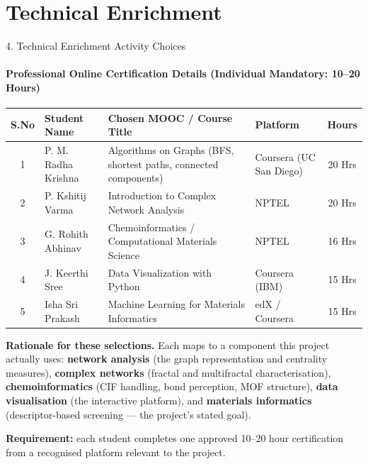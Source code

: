 \documentclass[aspectratio=169, 11pt]{beamer}
\begin{document}
\section{Technical Enrichment}
\begin{frame}{4. Technical Enrichment Activity Choices}
\framesubtitle{Professional Online Certification Details (Individual Mandatory: 10--20 Hours)}
\vspace{-0.1cm}
\begin{table}
\centering
\scriptsize
\renewcommand{\arraystretch}{1.12}
\begin{tabular}{|c|p{2.6cm}|p{4.6cm}|p{2.0cm}|c|}
\hline
\textbf{S.No} & \textbf{Student Name} & \textbf{Chosen MOOC / Course Title} &
\textbf{Platform} & \textbf{Hours} \\
\hline
1 & P. M. Radha Krishna & Algorithms on Graphs (BFS, shortest paths, connected
components) & Coursera (UC San Diego) & 20 Hrs \\
\hline
2 & P. Kshitij Varma & Introduction to Complex Network Analysis &
NPTEL & 20 Hrs \\
\hline
3 & G. Rohith Abhinav & Chemoinformatics / Computational Materials Science &
NPTEL & 16 Hrs \\
\hline
4 & J. Keerthi Sree & Data Visualization with Python &
Coursera (IBM) & 15 Hrs \\
\hline
5 & Isha Sri Prakash & Machine Learning for Materials Informatics &
edX / Coursera & 15 Hrs \\
\hline
\end{tabular}
\end{table}
\vspace{0.1cm}
{\scriptsize
\textbf{Rationale for these selections.} Each maps to a component this project actually
uses: \textbf{network analysis} (the graph representation and centrality measures),
\textbf{complex networks} (fractal and multifractal characterisation),
\textbf{chemoinformatics} (CIF handling, bond perception, MOF structure),
\textbf{data visualisation} (the interactive platform), and \textbf{materials informatics}
(descriptor-based screening --- the project's stated goal).

\vspace{0.06cm}
\textbf{Requirement:} each student completes one approved 10--20 hour certification from a
recognised platform relevant to the project.}
\end{frame}

\end{document}
